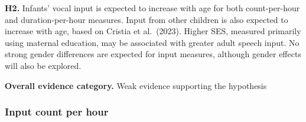 \documentclass[
  letterpaper,
  DIV=11,
  numbers=noendperiod]{scrartcl}
\begin{document}
\textbf{H2.} Infants' vocal input is expected to increase with age for
both count-per-hour and duration-per-hour measures. Input from other
children is also expected to increase with age, based on Cristia et
al.~(2023). Higher SES, measured primarily using maternal education, may
be associated with greater adult speech input. No strong gender
differences are expected for input measures, although gender effects
will also be explored.

\textbf{Overall evidence category.} Weak evidence supporting the
hypothesis

\hypertarget{input-count-per-hour-1}{%
\subsubsection{Input count per hour}\label{input-count-per-hour-1}}
\end{document}
